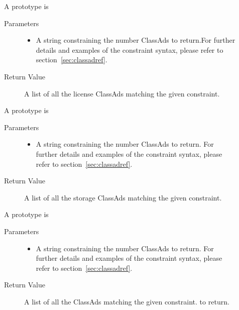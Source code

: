 \begin{description}
\item []
  A prototype is 


  \begin{description}
    \item[ Parameters]
    \begin{itemize}
      \item {} 
      A string constraining the number ClassAds to return.For further details 
      and examples of the constraint syntax, please refer to 
      section~\ref{sec:classadref}.
    \end{itemize}
    \item[ Return Value]
      A list of all the license ClassAds matching the given constraint.
  \end{description}
  
\item []
  A prototype is 


  \begin{description}
    \item[ Parameters]
    \begin{itemize}
      \item {}
      A string constraining the number ClassAds to return. For further details 
      and examples of the constraint syntax, please refer to 
      section~\ref{sec:classadref}.
    \end{itemize}
    \item[ Return Value]
      A list of all the storage ClassAds matching the given constraint.
  \end{description} 

\item []
  A prototype is 

  
  \begin{description}
    \item[ Parameters]
    \begin{itemize}
      \item {} 
      A string constraining the number ClassAds to return. For further details 
      and examples of the constraint syntax, please refer to 
      section~\ref{sec:classadref}.
    \end{itemize}
    \item[ Return Value]
      A list of all the ClassAds matching the given constraint.
      to return.
  \end{description}  

\end{description}

